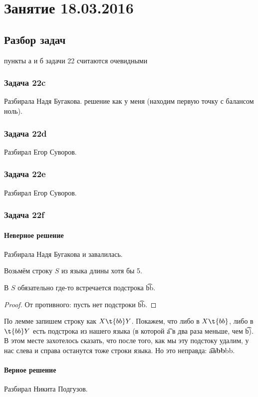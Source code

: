 \chapter{Занятие 18.03.2016}
\section{Разбор задач}

\TODO пункты а и б задачи 22 считаются очевидными

\subsection{Задача 22c}
	Разбирала Надя Бугакова.
	\TODO решение как у меня (находим первую точку с балансом ноль).

\subsection{Задача 22d}
	Разбирал Егор Суворов.
	\TODO

\subsection{Задача 22e}
	Разбирал Егор Суворов.
	\TODO

\subsection{Задача 22f}
	\subsubsection{Неверное решение}
		Разбирала Надя Бугакова и завалилась.

		Возьмём строку $S$ из языка длины хотя бы 5.
		\begin{lemma}
			В $S$ обязательно где-то встречается подстрока \t{bb}.
		\end{lemma}
		\begin{proof}
			От противного: пусть нет подстроки \t{bb}.
		\end{proof}

		По лемме запишем строку как $X\t{bb}Y$.
		Покажем, что либо в $X\t{bb}$, либо в $\t{bb}Y$ есть подстрока из нашего языка
		(в которой \t{a} в два раза меньше, чем \t{b}).
		В этом месте захотелось сказать, что после того, как мы эту подстоку удалим,
		у нас слева и справа останутся тоже строки языка.
		Но это неправда: \t{a\textbf{abb}bb}.

	\subsubsection{Верное решение}
		Разбирал Никита Подгузов.

